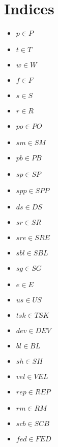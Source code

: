 \documentclass[11pt]{article}
\begin{document}
\section{Indices}
\begin{itemize}[label=--]
    \item $p \in P$
    \item $t \in T$
    \item $w \in W$
    \item $f \in F$
    \item $s \in S$
    \item $r \in R$
    \item $po \in PO$
    \item $sm \in SM$
    \item $pb \in PB$
    \item $sp \in SP$
    \item $spp \in SPP$
    \item $ds \in DS$
    \item $sr \in SR$
    \item $sre \in SRE$
    \item $sbl \in SBL$
    \item $sg \in SG$
    \item $e \in E$
    \item $us \in US$
    \item $tsk \in TSK$
    \item $dev \in DEV$
    \item $bl \in BL$
    \item $sh \in SH$
    \item $vel \in VEL$
    \item $rep \in REP$
    \item $rm \in RM$
    \item $scb \in SCB$
    \item $fed \in FED$
\end{itemize}
\end{document}
